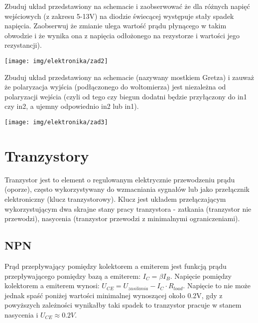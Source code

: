 \documentclass{pdfBooklets}
\begin{document}
\begin{Zadanie}{}{}
\noindent\begin{minipage}[b]{0.7\textwidth}
Zbuduj układ przedstawiony na schemacie i zaobserwować że dla różnych napięć wejściowych (z zakresu 5-13V) na diodzie świecącej występuje stały spadek napięcia.
Zaobserwuj że zmianie ulega wartość prądu płynącego w takim obwodzie i że wynika ona z napięcia odłożonego na rezystorze i wartości jego rezystancji).
\end{minipage}
\hfill
\begin{minipage}[b]{0.25\textwidth}
\texttt{[image: img/elektronika/zad2]}\vspace{0.5cm}
\end{minipage}
\end{Zadanie}


\begin{Zadanie}{}{}
\noindent\begin{minipage}[b]{0.6\textwidth}
Zbuduj układ przedstawiony na schemacie (nazywany mostkiem Gretza) i zauważ że polaryzacja wyjścia (podłączonego do woltomierza) jest niezależna od polaryzacji wejścia (czyli od tego czy biegun dodatni będzie przyłączony do in1 czy in2, a ujemny odpowiednio in2 lub in1).
\end{minipage}
\hfill
\begin{minipage}[b]{0.35\textwidth}
\texttt{[image: img/elektronika/zad3]}
\end{minipage}
\end{Zadanie}

\section{Tranzystory}
Tranzystor jest to element o regulowanym elektrycznie przewodzeniu prądu (oporze), często wykorzystywany do wzmacniania sygnałów lub jako przełącznik elektroniczny (klucz tranzystorowy).
Klucz jest układem przełączającym wykorzystującym dwa skrajne stany pracy tranzystora - zatkania (tranzystor nie przewodzi), nasycenia (tranzystor przewodzi z minimalnymi ograniczeniami).

\subsection{NPN}
Prąd przepływający pomiędzy kolektorem a emiterem jest funkcją prądu przepływającego pomiędzy bazą a emiterem: $I_C = \beta I_B$.
Napięcie pomiędzy kolektorem a emiterem wynosi: $U_{CE} = U_{zasilania} - I_C \cdot R_{load}$.
Napięcie to nie może jednak spaść poniżej wartości minimalnej wynoszącej około 0.2V, gdy z powyższych zależności wynikałby taki spadek to tranzystor pracuje w stanem nasycenia i $U_{CE} \approx 0.2V$.
\end{document}
